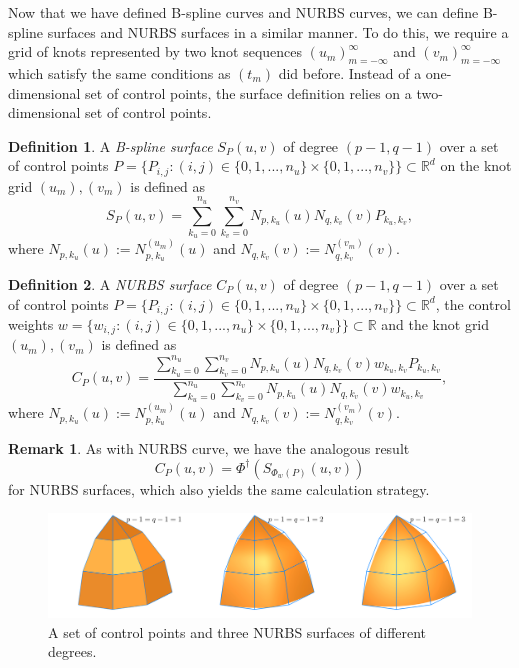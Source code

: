 \documentclass[a4paper, 11pt]{report}
\theoremstyle{definition}
\newtheorem{definition}{Definition}[section]
\newtheorem*{remark}{Remark}
\renewcommand{\emph}[1]{\textit{#1}}
\begin{document}
	Now that we have defined B-spline curves and NURBS curves, we can define B-spline surfaces and NURBS surfaces in a similar manner. To do this, we require a grid of knots represented by two knot sequences $(u_m)_{m=-\infty}^{\infty}$ and $(v_m)_{m=-\infty}^{\infty}$ which satisfy the same conditions as $(t_m)$ did before. Instead of a one-dimensional set of control points, the surface definition relies on a two-dimensional set of control points.

	\begin{definition}
		A \emph{B-spline surface} $S_P(u,v)$ of degree $(p-1, q-1)$ over a set of control points $P = \{P_{i,j} : (i,j) \in \{0,1,...,n_u\} \times \{0,1,...,n_v\}\} \subset \mathbb{R}^d$ on the knot grid $(u_m), (v_m)$ is defined as
			$$ S_P(u,v) = \sum_{k_u=0}^{n_u} \sum_{k_v=0}^{n_v} N_{p,k_u}(u) N_{q,k_v}(v) P_{k_u,k_v},$$
		where $N_{p,k_u}(u) := N_{p,k_u}^{(u_m)}(u)$ and $N_{q,k_v}(v) := N_{q,k_v}^{(v_m)}(v)$.
	\end{definition}

	\begin{definition}
		A \emph{NURBS surface} $C_P(u,v)$ of degree $(p-1, q-1)$ over a set of control points $P = \{P_{i,j} : (i,j) \in \{0,1,...,n_u\} \times \{0,1,...,n_v\}\} \subset \mathbb{R}^d$, the control weights $w = \{w_{i,j} : (i,j) \in \{0,1,...,n_u\} \times \{0,1,...,n_v\}\} \subset \mathbb{R}$ and the knot grid $(u_m), (v_m)$ is defined as
			$$ C_P(u,v) = \frac {\sum_{k_u=0}^{n_u} \sum_{k_v=0}^{n_v} N_{p,k_u}(u) N_{q,k_v}(v) w_{k_u, k_v} P_{k_u,k_v}}{\sum_{k_u=0}^{n_u} \sum_{k_v=0}^{n_v} N_{p,k_u}(u) N_{q,k_v}(v) w_{k_u, k_v}},$$
		where $N_{p,k_u}(u) := N_{p,k_u}^{(u_m)}(u)$ and $N_{q,k_v}(v) := N_{q,k_v}^{(v_m)}(v)$.
	\end{definition}

	\begin{remark}
		As with NURBS curve, we have the analogous result
			$$ C_P(u,v) = \Phi^\dagger ({S_{\Phi_w(P)}(u,v)}) $$
		for NURBS surfaces, which also yields the same calculation strategy.
	\end{remark}

	\begin{figure}[H]
		\centering
		\includegraphics[width=\textwidth]{../tec/nurbsSurface/nurbsSurface.png}
		\caption{A set of control points and three NURBS surfaces of different degrees.}
	\end{figure}
\end{document}
